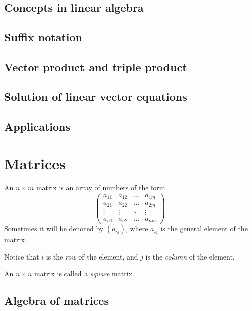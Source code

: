 \documentclass[main.tex]{subfiles}
\begin{document}
		\subsection{Concepts in linear algebra}
		
		\subsection{Suffix notation}
		
		\subsection{Vector product and triple product}
		
		\subsection{Solution of linear vector equations}
		
		\subsection{Applications}
		
	\section{Matrices}
		\begin{definition}
			An $n \times m$ matrix is an array of numbers of the form
			\begin{equation*}
				\begin{pmatrix}
				a_{11} & a_{12} & \ldots & a_{1m} \\
				a_{21} & a_{22} & \ldots & a_{2m} \\
				\vdots & \vdots & \ddots & \vdots \\
				a_{n1} & a_{n2} & \ldots & a_{nm}
				\end{pmatrix}.
			\end{equation*}
			Sometimes it will be denoted by $(a_{ij})$, where $a_{ij}$ is the general element of the matrix.
		\end{definition}
			Notice that $i$ is the \textit{row} of the element, and $j$ is the \textit{column} of the element.
			\begin{definition}
				An $n \times n$ matrix is called a \textit{square} matrix.
			\end{definition}
		\subsection{Algebra of matrices}
		
\end{document}
